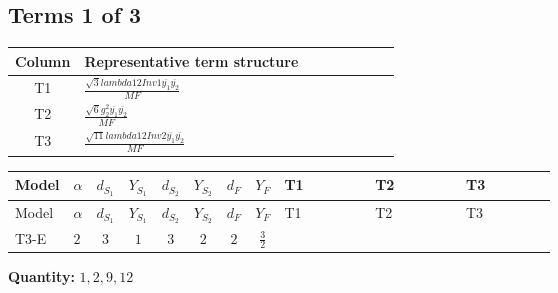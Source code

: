 \documentclass[8pt]{article}
\begin{document}
\begin{landscape}
\subsection*{Terms 1 of 3}
\begin{center}
\begin{tabular}{@{}c >{\raggedright\arraybackslash}p{0.82\linewidth}@{}}
\toprule
Column & Representative term structure \\
\midrule
T1 & \(\displaystyle \frac{\sqrt{3} lambda12Inv1 \overline{y_{1}} \overline{y_{2}}}{MF}\) \\
\midrule
T2 & \(\displaystyle \frac{\sqrt{6} g_{2}^{2} \overline{y_{1}} \overline{y_{2}}}{MF}\) \\
\midrule
T3 & \(\displaystyle \frac{\sqrt{11} lambda12Inv2 \overline{y_{1}} \overline{y_{2}}}{MF}\) \\
\midrule
\bottomrule
\end{tabular}
\end{center}
\smallskip
\tiny
\begin{longtable}{@{}llcccccc >{\raggedright\arraybackslash}p{0.21\linewidth} >{\raggedright\arraybackslash}p{0.21\linewidth} >{\raggedright\arraybackslash}p{0.21\linewidth}@{}}
\toprule
Model & $\alpha$ & $d_{S_1}$ & $Y_{S_1}$ & $d_{S_2}$ & $Y_{S_2}$ & $d_F$ & $Y_F$ & T1 & T2 & T3 \\
\midrule
\endfirsthead
\toprule
Model & $\alpha$ & $d_{S_1}$ & $Y_{S_1}$ & $d_{S_2}$ & $Y_{S_2}$ & $d_F$ & $Y_F$ & T1 & T2 & T3 \\
\midrule
\endhead
T3-E & $2$ & $3$ & $1$ & $3$ & $2$ & $2$ & $\frac{3}{2}$ & \scriptsize\adjustbox{max width=\linewidth}{$\begin{gathered} - \frac{\sqrt{3} lambda12Inv1 \overline{y_{1}} \overline{y_{2}}}{6 MF}\end{gathered}$} & \scriptsize\adjustbox{max width=\linewidth}{$\begin{gathered} \frac{\sqrt{6} g_{2}^{2} \overline{y_{1}} \overline{y_{2}}}{6 MF}\end{gathered}$} & \scriptsize\adjustbox{max width=\linewidth}{$\begin{gathered} \frac{3 \sqrt{11} lambda12Inv2 \overline{y_{1}} \overline{y_{2}}}{22 MF}\end{gathered}$} \\
\midrule
\bottomrule
\end{longtable}
\clearpage
\noindent\textbf{Quantity: }$\mathrm{1,2,9,12}$\par\smallskip

\end{landscape}
\end{document}
